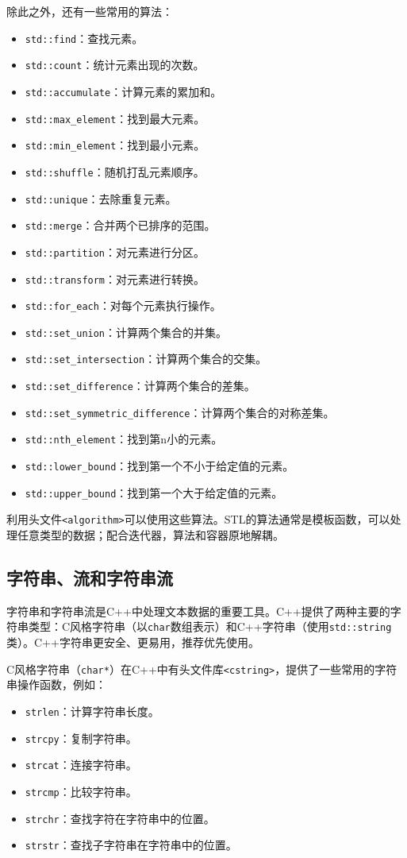 \documentclass[../main.tex]{subfiles}
\begin{document}
除此之外，还有一些常用的算法：
\begin{itemize}
  \item \texttt{std::find}：查找元素。
  \item \texttt{std::count}：统计元素出现的次数。
  \item \texttt{std::accumulate}：计算元素的累加和。
  \item \texttt{std::max\_element}：找到最大元素。
  \item \texttt{std::min\_element}：找到最小元素。
  \item \texttt{std::shuffle}：随机打乱元素顺序。
  \item \texttt{std::unique}：去除重复元素。
  \item \texttt{std::merge}：合并两个已排序的范围。
  \item \texttt{std::partition}：对元素进行分区。
  \item \texttt{std::transform}：对元素进行转换。
  \item \texttt{std::for\_each}：对每个元素执行操作。
  \item \texttt{std::set\_union}：计算两个集合的并集。
  \item \texttt{std::set\_intersection}：计算两个集合的交集。
  \item \texttt{std::set\_difference}：计算两个集合的差集。
  \item \texttt{std::set\_symmetric\_difference}：计算两个集合的对称差集。
  \item \texttt{std::nth\_element}：找到第n小的元素。
  \item \texttt{std::lower\_bound}：找到第一个不小于给定值的元素。
  \item \texttt{std::upper\_bound}：找到第一个大于给定值的元素。
\end{itemize}

利用头文件\texttt{<algorithm>}可以使用这些算法。STL的算法通常是模板函数，可以处理任意类型的数据；配合迭代器，算法和容器原地解耦。

\subsection{字符串、流和字符串流}

字符串和字符串流是C++中处理文本数据的重要工具。C++提供了两种主要的字符串类型：C风格字符串（以\texttt{char}数组表示）和C++字符串（使用\texttt{std::string}类）。C++字符串更安全、更易用，推荐优先使用。

C风格字符串（\texttt{char*}）在C++中有头文件库\texttt{<cstring>}，提供了一些常用的字符串操作函数，例如：
\begin{itemize}
  \item \texttt{strlen}：计算字符串长度。
  \item \texttt{strcpy}：复制字符串。
  \item \texttt{strcat}：连接字符串。
  \item \texttt{strcmp}：比较字符串。
  \item \texttt{strchr}：查找字符在字符串中的位置。
  \item \texttt{strstr}：查找子字符串在字符串中的位置。
\end{itemize}
\end{document}
